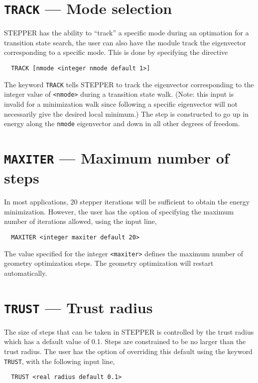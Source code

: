 \section{{\tt TRACK} --- Mode selection}

STEPPER has the ability to ``track'' a specific mode during an
optimation for a transition state search, the user can also have the
module track the eigenvector corresponding to a specific mode.  This
is done by specifying the directive 
\begin{verbatim}
  TRACK [nmode <integer nmode default 1>]
\end{verbatim}
The keyword \verb+TRACK+ tells STEPPER to track the eigenvector
corresponding to the integer value of \verb+<nmode>+ during a transition
state walk.  (Note: this input is invalid for a minimization walk
since following a specific eigenvector will not necessarily give the
desired local minimum.)  The step is constructed to go up in energy
along the \verb+nmode+ eigenvector and down in all other degrees of
freedom.

\section{{\tt MAXITER} --- Maximum number of steps}

In most applications, 20 stepper iterations will be sufficient to
obtain the energy minimization.  However, the user has the option of
specifying the maximum number of iterations allowed, using the input
line,
\begin{verbatim}
  MAXITER <integer maxiter default 20>
\end{verbatim}
The value specified for the integer \verb+<maxiter>+ defines the maximum
number of geometry optimization steps.  The geometry optimization will
restart automatically.

\section{{\tt TRUST} --- Trust radius}

The size of steps that can be taken in STEPPER is controlled by the
trust radius which has a default value of 0.1.  Steps are constrained
to be no larger than the trust radius.  The user has the option of
overriding this default using the keyword \verb+TRUST+, with the
following input line,
\begin{verbatim}
  TRUST <real radius default 0.1>
\end{verbatim}

